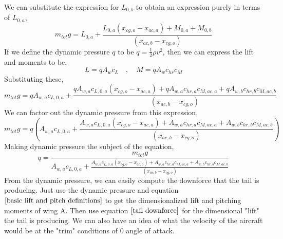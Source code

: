 We can substitute the expression for $L_{0,b}$ to obtain an expression purely in terms of $L_{0,a}$,
$$m_{tot}g = L_{0,a} + \frac{L_{0,a}(x_{cg,o}-x_{ac,a}) + M_{0,a} + M_{0,b}}{(x_{ac,b}-x_{cg,o})}$$
If we define the dynamic pressure $q$ to be $\displaystyle q = \frac{1}{2}\rho v^{2}$, then we can express the lift and moments to be,
\begin{equation}L = qA_{w}c_{L} \quad,\quad M = qA_{w}c_{hr}c_{M} \label{basic lift and pitch definitions}\end{equation}
Substituting these,
$$m_{tot}g = qA_{w,a}c_{L,0,a} + \frac{qA_{w,a}c_{L,0,a}(x_{cg,o}-x_{ac,a}) + qA_{w,a}c_{hr,a}c_{M,ac,a} + qA_{w,b}c_{hr,b}c_{M,ac,b}}{(x_{ac,b}-x_{cg,o})}$$
We can factor out the dynamic pressure from this expression,
$$m_{tot}g = q\left(A_{w,a}c_{L,0,a} + \frac{A_{w,a}c_{L,0,a}(x_{cg,o}-x_{ac,a}) + A_{w,a}c_{hr,a}c_{M,ac,a} + A_{w,b}c_{hr,b}c_{M,ac,b}}{(x_{ac,b}-x_{cg,o})}\right)$$
Making dynamic pressure the subject of the equation,
\begin{equation}
q = \frac{m_{tot}g}{\displaystyle  A_{w,a}c_{L,0,a} + \frac{A_{w,a}c_{L,0,a}(x_{cg,o}-x_{ac,a}) + A_{w,a}c_{hr,a}c_{M,ac,a} + A_{w,b}c_{hr,b}c_{M,ac,b}}{(x_{ac,b}-x_{cg,o})} } 
\label{dynamic pressure at trim}\end{equation}
From the dynamic pressure, we can easily compute the downforce that the tail is producing. Just use the dynamic pressure and equation $\ref{basic lift and pitch definitions}$ to get the dimensionalized lift and pitching moments of wing A. Then use equation $\ref{tail downforce}$ for the dimensional "lift" the tail is producing. We can also have an idea of what the velocity of the aircraft would be at the "trim" conditions of $0$ angle of attack.


